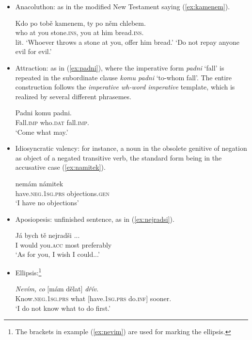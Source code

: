\documentclass[output=paper,colorlinks,citecolor=brown]{langscibook}
\begin{document}
\begin{itemize}
    \item Anacoluthon: as in the modified New Testament saying (\ref{ex:kamenem}).
  
\ea 
\gll Kdo po tobě kamenem, ty po něm chlebem.\\
     who at you stone.\textsc{ins}, you  at him bread.\textsc{ins}.\\
     \glt lit. `Whoever throws a stone at you, offer him bread.'
     \glt `Do not repay anyone evil for evil.' \label{ex:kamenem}
\z

    \item Attraction: as in (\ref{ex:padni}), where the imperative form \emph{padni} ‘fall’ is repeated in the subordinate clause \emph{komu padni} ‘to-whom fall’. The entire construction follows the \textit{imperative wh-word imperative} template, which is realized by several different phrasemes.
    
\ea \label{ex:padni}
\gll Padni komu padni.\\
     Fall.\textsc{imp} who.\textsc{dat} fall.\textsc{imp}.\\
\glt `Come what may.'
\z  
    \item Idiosyncratic valency: for instance, a noun in the obsolete genitive of negation as object of
a negated transitive verb, the standard form being in the accusative case (\ref{ex:namitek}).

\ea \label{ex:namitek}
\gll nemám námitek\\
     have.\textsc{neg.1sg.prs} objections.\textsc{gen}\\
\glt `I have no objections'
\z

    \item Aposiopesis: unfinished sentence, as in (\ref{ex:nejradsi}).

\ea \label{ex:nejradsi}
\gll 
Já bych tě {nejradši ...}\\
I would you.\textsc{acc} {most preferably} \\
\glt
`As for you, I wish I could...'
\z 

    \item Ellipsis:\footnote{The brackets in example (\ref{ex:nevim}) are used for marking the ellipsis.}

\ea \label{ex:nevim}
\gll \emph{Nevím,} \emph{co} [mám dělat] \emph{dřív}.\\
     Know.\textsc{neg}.\textsc{1sg.prs} what [have.\textsc{1sg.prs} do.\textsc{inf}] sooner.\\
\glt `I do not know what to do first.'
\z


\end{itemize}
\end{document}
